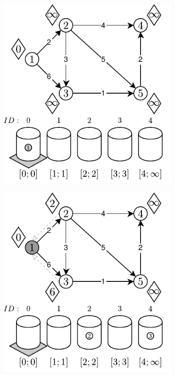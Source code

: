 \begin{figure}[!htbp]
	\centering
	\begin{subfigure}[b]{0.32\textwidth}
		\includegraphics[width=\textwidth]{Chapter_II/OVERFLOW-BUCKET-Example/a.pdf}
		\caption{}
	\end{subfigure}%
	\begin{subfigure}[b]{0.32\textwidth}
		\includegraphics[width=\textwidth]{Chapter_II/OVERFLOW-BUCKET-Example/b.pdf}

\end{subfigure}
\end{figure}
